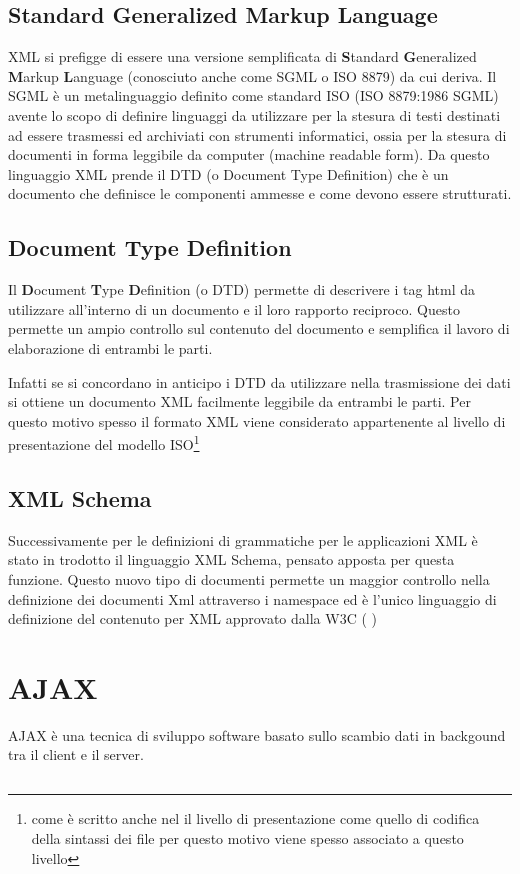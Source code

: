 \documentclass{report}
\begin{document}
\section{Standard Generalized Markup Language}
XML si prefigge di essere una versione semplificata di \textbf{S}tandard \textbf{G}eneralized \textbf{M}arkup \textbf{L}anguage (conosciuto anche come SGML o ISO 8879) da cui deriva.
Il SGML è un metalinguaggio definito come standard ISO (ISO 8879:1986 SGML) avente lo scopo di definire linguaggi da utilizzare per la stesura di testi destinati ad essere trasmessi ed archiviati con strumenti informatici, ossia per la stesura di documenti in forma leggibile da computer (machine readable form). Da questo linguaggio XML prende il DTD (o Document Type Definition) che è un documento che definisce le componenti ammesse e come devono essere strutturati.

\section{Document Type Definition}
Il \textbf{D}ocument \textbf{T}ype \textbf{D}efinition (o DTD) permette di descrivere i tag html da utilizzare all'interno di un documento e il loro rapporto reciproco. Questo permette un ampio controllo sul contenuto del documento e semplifica il lavoro di elaborazione di entrambi le parti. 

Infatti se si concordano in anticipo i DTD da utilizzare nella trasmissione dei dati si ottiene un documento XML facilmente leggibile da entrambi le parti. Per questo motivo spesso il formato XML viene considerato appartenente al livello di presentazione del modello ISO\footnote{come è scritto anche nel\textcite[p.~42]{tanenbaum:reti} il livello di presentazione come quello di codifica della sintassi dei file per questo motivo viene spesso associato a questo livello}

\section{XML Schema}
Successivamente per le definizioni di grammatiche per le applicazioni XML è stato in trodotto il linguaggio XML Schema, pensato apposta per questa funzione. Questo nuovo tipo di documenti permette un maggior controllo nella definizione dei documenti Xml attraverso i namespace ed è l'unico linguaggio di definizione del contenuto per XML approvato dalla W3C (\cite{site:w3cxmlschame} )


\chapter{AJAX}
AJAX è una tecnica di sviluppo software basato sullo scambio dati in backgound tra il client e il server. 


\newpage
\section*{\refname}
\printbibliography[heading=libri, category=libri]
\printbibliography[heading=web, category=web]
\end{document}
